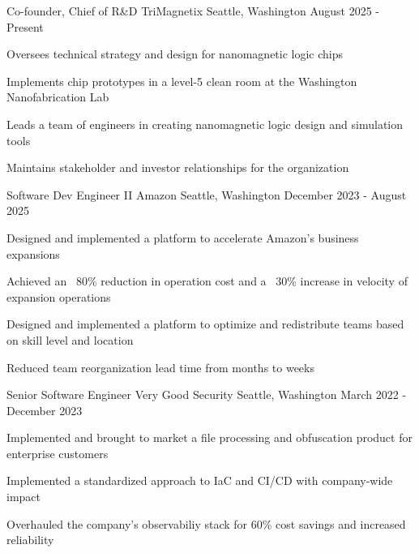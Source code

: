 


\begin{cventries}

\cventry
{Co-founder, Chief of R\&D} %
{TriMagnetix} %
{Seattle, Washington} %
{August 2025 - Present} %
{ %
\begin{cvitems}
\item{Oversees technical strategy and design for nanomagnetic logic chips}
\item{Implements chip prototypes in a level-5 clean room at the Washington Nanofabrication Lab}
\item{Leads a team of engineers in creating nanomagnetic logic design and simulation tools}
\item{Maintains stakeholder and investor relationships for the organization}
\end{cvitems}
}

\cventry
{Software Dev Engineer II} %
{Amazon} %
{Seattle, Washington} %
{December 2023 - August 2025} %
{ %
\begin{cvitems}
\item{Designed and implemented a platform to accelerate Amazon's business expansions}
\item{Achieved an ~80\% reduction in operation cost and a ~30\% increase in velocity of expansion operations}
\item{Designed and implemented a platform to optimize and redistribute teams based on skill level and location}
\item{Reduced team reorganization lead time from months to weeks}
\end{cvitems}
}

\cventry
{Senior Software Engineer} %
{Very Good Security} %
{Seattle, Washington} %
{March 2022 - December 2023} %
{ %
\begin{cvitems}
\item{Implemented and brought to market a file processing and obfuscation product for enterprise customers}
\item{Implemented a standardized approach to IaC and CI/CD with company-wide impact}
\item{Overhauled the company's observabiliy stack for 60\% cost savings and increased reliability}
\end{cvitems}
}


\end{cventries}
